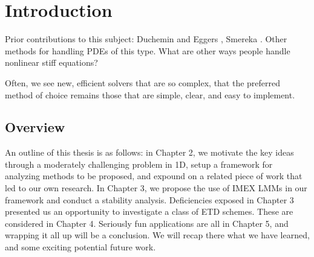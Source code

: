\chapter{Introduction}
Prior contributions to this subject: Duchemin and Eggers \cite{duchemin2014explicit}, Smereka \cite{smereka2003semi}. Other methods for handling PDEs of this type.
What are other ways people handle nonlinear stiff equations? 

Often, we see new, efficient solvers that are so complex, that the preferred method of choice remains those that are simple, clear, and easy to implement. 

\section{Overview}
An outline of this thesis is as follows: in Chapter 2, we motivate the key ideas through a moderately challenging problem in 1D, setup a framework for analyzing methods to be proposed, and expound on a related piece of work that led to our own research. In Chapter 3, we propose the use of IMEX LMMs in our framework and conduct a stability analysis. Deficiencies exposed in Chapter 3 presented us an opportunity to investigate a class of ETD schemes. These are considered in Chapter 4. Seriously fun applications are all in Chapter 5, and wrapping it all up will be a conclusion. We will recap there what we have learned, and some exciting potential future work.  